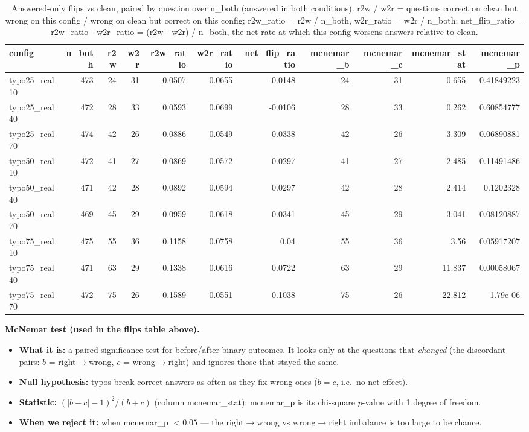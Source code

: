 \documentclass[11pt]{article}
\begin{document}
\begin{table}[H]
\centering
\caption{Answered-only flips vs clean, paired by question over n\_both (answered in both conditions). r2w / w2r = questions correct on clean but wrong on this config / wrong on clean but correct on this config; r2w\_ratio = r2w / n\_both, w2r\_ratio = w2r / n\_both; net\_flip\_ratio = r2w\_ratio - w2r\_ratio = (r2w - w2r) / n\_both, the net rate at which this config worsens answers relative to clean.}
\small
\begin{adjustbox}{max width=\textwidth}
\begin{tabular}{lrrrrrrrrrr}
\toprule
\textbf{config} & \textbf{n\_both} & \textbf{r2w} & \textbf{w2r} & \textbf{r2w\_ratio} & \textbf{w2r\_ratio} & \textbf{net\_flip\_ratio} & \textbf{mcnemar\_b} & \textbf{mcnemar\_c} & \textbf{mcnemar\_stat} & \textbf{mcnemar\_p} \\
\midrule
typo25\_real10 & 473 & 24 & 31 & 0.0507 & 0.0655 & -0.0148 & 24 & 31 & 0.655 & 0.41849223 \\
typo25\_real40 & 472 & 28 & 33 & 0.0593 & 0.0699 & -0.0106 & 28 & 33 & 0.262 & 0.60854777 \\
typo25\_real70 & 474 & 42 & 26 & 0.0886 & 0.0549 & 0.0338 & 42 & 26 & 3.309 & 0.06890881 \\
typo50\_real10 & 472 & 41 & 27 & 0.0869 & 0.0572 & 0.0297 & 41 & 27 & 2.485 & 0.11491486 \\
typo50\_real40 & 471 & 42 & 28 & 0.0892 & 0.0594 & 0.0297 & 42 & 28 & 2.414 & 0.1202328 \\
typo50\_real70 & 469 & 45 & 29 & 0.0959 & 0.0618 & 0.0341 & 45 & 29 & 3.041 & 0.08120887 \\
typo75\_real10 & 475 & 55 & 36 & 0.1158 & 0.0758 & 0.04 & 55 & 36 & 3.56 & 0.05917207 \\
typo75\_real40 & 471 & 63 & 29 & 0.1338 & 0.0616 & 0.0722 & 63 & 29 & 11.837 & 0.00058067 \\
typo75\_real70 & 472 & 75 & 26 & 0.1589 & 0.0551 & 0.1038 & 75 & 26 & 22.812 & 1.79e-06 \\
\bottomrule
\end{tabular}
\end{adjustbox}
\end{table}

\medskip
\noindent\textbf{McNemar test (used in the flips table above).}
\begin{itemize}\setlength{\itemsep}{1pt}
  \item \textbf{What it is:} a paired significance test for before/after binary
  outcomes. It looks only at the questions that \emph{changed} (the discordant pairs:
  $b$ = right$\to$wrong, $c$ = wrong$\to$right) and ignores those that stayed the same.
  \item \textbf{Null hypothesis:} typos break correct answers as often as they fix
  wrong ones ($b = c$, i.e.\ no net effect).
  \item \textbf{Statistic:} $(|b - c| - 1)^2 / (b + c)$ (column mcnemar\_stat);
  mcnemar\_p is its chi-square $p$-value with 1 degree of freedom.
  \item \textbf{When we reject it:} when mcnemar\_p $< 0.05$ --- the
  right$\to$wrong vs wrong$\to$right imbalance is too large to be chance.
\end{itemize}
\end{document}
